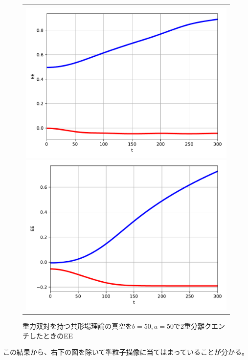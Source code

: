 \begin{figure}[H]
\begin{tabular}{c}
		\begin{minipage}{0.06\hsize}
			\vspace{10mm}
		\end{minipage} \\
		\begin{minipage}{0.50\hsize}
			\centering
			\includegraphics[width=\linewidth]{dh0945_30_100.pdf}
		\end{minipage}
		\begin{minipage}{0.50\hsize}
			\centering
			\includegraphics[width=\linewidth]{dh0945_150_100.pdf}
		\end{minipage}
	\end{tabular}
	\caption{重力双対を持つ共形場理論の真空を$b=50,a=50$で2重分離クエンチしたときのEE}
	\label{fig:dh0945}
\end{figure}
この結果から、右下の図を除いて準粒子描像に当てはまっていることが分かる。


